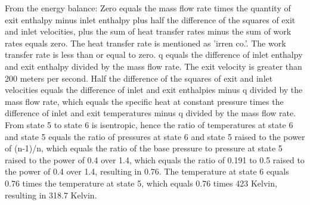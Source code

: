 From the energy balance:
Zero equals the mass flow rate times the quantity of exit enthalpy minus inlet enthalpy plus half the difference of the squares of exit and inlet velocities, plus the sum of heat transfer rates minus the sum of work rates equals zero.
The heat transfer rate is mentioned as 'irren co.'.
The work transfer rate is less than or equal to zero.
q equals the difference of inlet enthalpy and exit enthalpy divided by the mass flow rate.
The exit velocity is greater than 200 meters per second.
Half the difference of the squares of exit and inlet velocities equals the difference of inlet and exit enthalpies minus q divided by the mass flow rate, which equals the specific heat at constant pressure times the difference of inlet and exit temperatures minus q divided by the mass flow rate.
From state 5 to state 6 is isentropic, hence the ratio of temperatures at state 6 and state 5 equals the ratio of pressures at state 6 and state 5 raised to the power of (n-1)/n, which equals the ratio of the base pressure to pressure at state 5 raised to the power of 0.4 over 1.4, which equals the ratio of 0.191 to 0.5 raised to the power of 0.4 over 1.4, resulting in 0.76.
The temperature at state 6 equals 0.76 times the temperature at state 5, which equals 0.76 times 423 Kelvin, resulting in 318.7 Kelvin.

